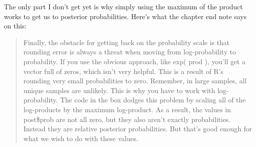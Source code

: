 \documentclass[
]{book}
\newenvironment{Shaded}{\begin{snugshade}}{\end{snugshade}}
\newcommand{\AttributeTok}[1]{\textcolor[rgb]{0.77,0.63,0.00}{#1}}
\newcommand{\CommentTok}[1]{\textcolor[rgb]{0.56,0.35,0.01}{\textit{#1}}}
\newcommand{\ConstantTok}[1]{\textcolor[rgb]{0.00,0.00,0.00}{#1}}
\newcommand{\DecValTok}[1]{\textcolor[rgb]{0.00,0.00,0.81}{#1}}
\newcommand{\FunctionTok}[1]{\textcolor[rgb]{0.00,0.00,0.00}{#1}}
\newcommand{\NormalTok}[1]{#1}
\newcommand{\OtherTok}[1]{\textcolor[rgb]{0.56,0.35,0.01}{#1}}
\newcommand{\SpecialCharTok}[1]{\textcolor[rgb]{0.00,0.00,0.00}{#1}}
\begin{document}
\begin{Shaded}
\end{Shaded}

The only part I don't get yet is why simply using the maximum of the product works to get us to posterior probabilities. Here's what the chapter end note says on this:

\begin{quote}
Finally, the obstacle for getting back on the probability scale is that rounding error is always a threat when moving from log-probability to probability. If you use the obvious approach, like exp( prod ), you'll get a vector full of zeros, which isn't very helpful. This is a result of R's rounding very small probabilities to zero. Remember, in large samples, all unique samples are unlikely. This is why you have to work with log-probability. The code in the box dodges this problem by scaling all of the log-products by the maximum log-product. As a result, the values in post\$prob are not all zero, but they also aren't exactly probabilities. Instead they are relative posterior probabilities. But that's good enough for what we wish to do with these values.
\end{quote}
\end{document}
